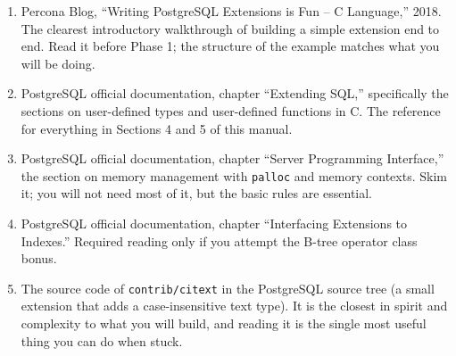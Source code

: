 \documentclass[11pt,a4paper]{article}
\begin{document}
\begin{enumerate}
\item Percona Blog, ``Writing PostgreSQL Extensions is Fun -- C Language,'' 2018. The clearest introductory walkthrough of building a simple extension end to end. Read it before Phase 1; the structure of the example matches what you will be doing.

\item PostgreSQL official documentation, chapter ``Extending SQL,'' specifically the sections on user-defined types and user-defined functions in C. The reference for everything in Sections 4 and 5 of this manual.

\item PostgreSQL official documentation, chapter ``Server Programming Interface,'' the section on memory management with \texttt{palloc} and memory contexts. Skim it; you will not need most of it, but the basic rules are essential.

\item PostgreSQL official documentation, chapter ``Interfacing Extensions to Indexes.'' Required reading only if you attempt the B-tree operator class bonus.

\item The source code of \texttt{contrib/citext} in the PostgreSQL source tree (a small extension that adds a case-insensitive text type). It is the closest in spirit and complexity to what you will build, and reading it is the single most useful thing you can do when stuck.
\end{enumerate}

\footerboxes
\end{document}
